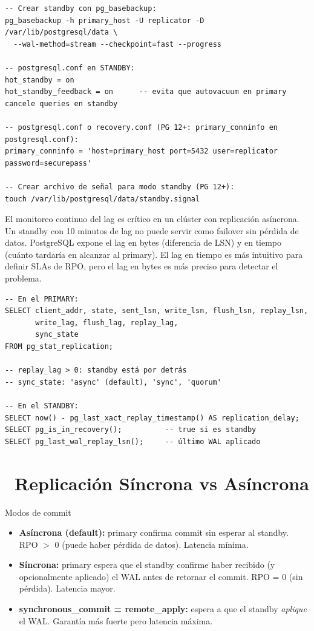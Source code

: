 \begin{lstlisting}[caption={Configurar streaming replication (Standby)}]
-- Crear standby con pg_basebackup:
pg_basebackup -h primary_host -U replicator -D /var/lib/postgresql/data \
  --wal-method=stream --checkpoint=fast --progress

-- postgresql.conf en STANDBY:
hot_standby = on
hot_standby_feedback = on      -- evita que autovacuum en primary cancele queries en standby

-- postgresql.conf o recovery.conf (PG 12+: primary_conninfo en postgresql.conf):
primary_conninfo = 'host=primary_host port=5432 user=replicator password=securepass'

-- Crear archivo de señal para modo standby (PG 12+):
touch /var/lib/postgresql/data/standby.signal
\end{lstlisting}

El monitoreo continuo del lag es crítico en un clúster con replicación asíncrona.
Un standby con 10 minutos de lag no puede servir como failover sin pérdida de datos.
PostgreSQL expone el lag en bytes (diferencia de LSN) y en tiempo (cuánto tardaría en alcanzar al primary).
El lag en tiempo es más intuitivo para definir SLAs de RPO, pero el lag en bytes es más preciso para detectar el problema.

\begin{lstlisting}[caption={Monitorear replication lag}]
-- En el PRIMARY:
SELECT client_addr, state, sent_lsn, write_lsn, flush_lsn, replay_lsn,
       write_lag, flush_lag, replay_lag,
       sync_state
FROM pg_stat_replication;

-- replay_lag > 0: standby está por detrás
-- sync_state: 'async' (default), 'sync', 'quorum'

-- En el STANDBY:
SELECT now() - pg_last_xact_replay_timestamp() AS replication_delay;
SELECT pg_is_in_recovery();          -- true si es standby
SELECT pg_last_wal_replay_lsn();     -- último WAL aplicado
\end{lstlisting}

\section[Replicación Síncrona vs Asíncrona]{~Replicación Síncrona vs Asíncrona}

\begin{teoriabox}{Modos de commit}
\begin{itemize}
  \item \textbf{Asíncrona (default):} primary confirma commit sin esperar al standby. RPO $>$ 0 (puede haber pérdida de datos). Latencia mínima.
  \item \textbf{Síncrona:} primary espera que el standby confirme haber recibido (y opcionalmente aplicado) el WAL antes de retornar el commit. RPO = 0 (sin pérdida). Latencia mayor.
  \item \textbf{synchronous\_commit = remote\_apply:} espera a que el standby \emph{aplique} el WAL. Garantía más fuerte pero latencia máxima.
\end{itemize}
\end{teoriabox}

